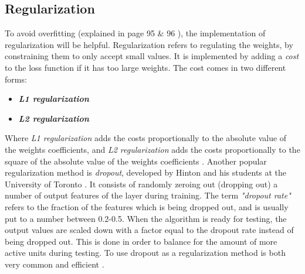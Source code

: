 \documentclass[USenglish]{ifimaster}  %
\begin{document}
\subsection{Regularization}
To avoid overfitting (explained in page 95 \& 96 \cite{Francois_Deep_learning_with_python}), the implementation of regularization will be helpful. Regularization refers to regulating the weights, by constraining them to only accept small values. It is implemented by adding a \textit{cost} to the loss function if it has too large weights. The cost comes in two different forms:

\begin{itemize}
    \item \textit{\textbf{L1 regularization}}
    \item \textit{\textbf{L2 regularization}}
\end{itemize}
Where \textit{L1 regularization} adds the costs proportionally to the absolute value of the weights coefficients, and \textit{L2 regularization} adds the costs proportionally to the square of the absolute value of the weights coefficients \cite{Francois_Deep_learning_with_python}. 
\newline
\newline
Another popular regularization method is \textit{dropout}, developed by Hinton and his students at the University of Toronto \cite{website:dropout}. It consists of randomly zeroing out (dropping out) a number of output features of the layer during training. The term \textit{"dropout rate"} refers to the fraction of the features which is being dropped out, and is usually put to a number between 0.2-0.5. When the algorithm is ready for testing, the output values are scaled down with a factor equal to the dropout rate instead of being dropped out. This is done in order to balance for the amount of more active units during testing. To use dropout as a regularization method is both very common and efficient \cite{Francois_Deep_learning_with_python}.   
\end{document}
